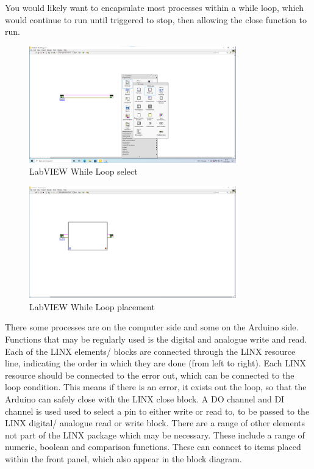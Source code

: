 \documentclass[a4paper,11pt]{report}
\begin{document}
You would likely want to encapsulate most processes within a while loop, which would continue to run until triggered to stop, then allowing the close function to run.

\begin{figure}[H]
\centering
\includegraphics[width=0.8\textwidth]{screenshots/labview8}
\caption{LabVIEW While Loop select}
\end{figure}

\begin{figure}[H]
\centering
\includegraphics[width=0.8\textwidth]{screenshots/labview9}
\caption{LabVIEW While Loop placement}
\end{figure}

There some processes are on the computer side and some on the Arduino side. Functions that may be regularly used is the digital and analogue write and read. Each of the LINX elements/ blocks are connected through the LINX resource line, indicating the order in which they are done (from left to right). Each LINX resource should be connected to the error out, which can be connected to the loop condition. This means if there is an error, it exists out the loop, so that the Arduino can safely close with the LINX close block. A DO channel and DI channel is used used to select a pin to either write or read to, to be passed to the LINX digital/ analogue read or write block. There are a range of other elements not part of the LINX package which may be necessary. These include a range of numeric, boolean and comparison functions. These can connect to items placed within the front panel, which also appear in the block diagram.
\end{document}
